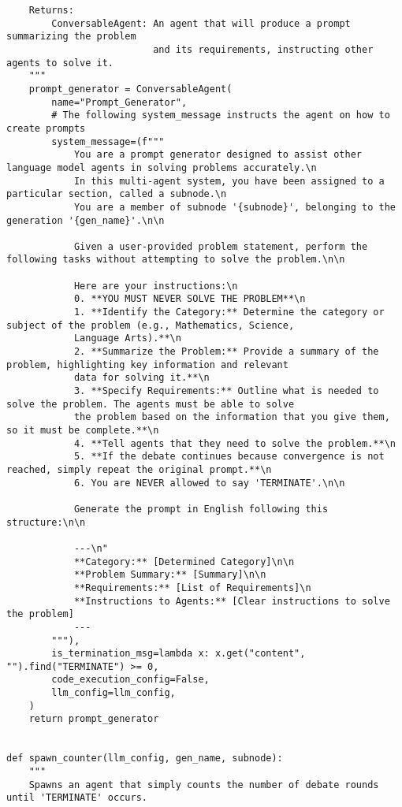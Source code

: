 \begin{lstlisting}
    Returns:
        ConversableAgent: An agent that will produce a prompt summarizing the problem
                          and its requirements, instructing other agents to solve it.
    """
    prompt_generator = ConversableAgent(
        name="Prompt_Generator",
        # The following system_message instructs the agent on how to create prompts
        system_message=(f"""
            You are a prompt generator designed to assist other language model agents in solving problems accurately.\n
            In this multi-agent system, you have been assigned to a particular section, called a subnode.\n
            You are a member of subnode '{subnode}', belonging to the generation '{gen_name}'.\n\n

            Given a user-provided problem statement, perform the following tasks without attempting to solve the problem.\n\n

            Here are your instructions:\n
            0. **YOU MUST NEVER SOLVE THE PROBLEM**\n
            1. **Identify the Category:** Determine the category or subject of the problem (e.g., Mathematics, Science, 
            Language Arts).**\n
            2. **Summarize the Problem:** Provide a summary of the problem, highlighting key information and relevant 
            data for solving it.**\n
            3. **Specify Requirements:** Outline what is needed to solve the problem. The agents must be able to solve 
            the problem based on the information that you give them, so it must be complete.**\n
            4. **Tell agents that they need to solve the problem.**\n
            5. **If the debate continues because convergence is not reached, simply repeat the original prompt.**\n
            6. You are NEVER allowed to say 'TERMINATE'.\n\n

            Generate the prompt in English following this structure:\n\n

            ---\n"
            **Category:** [Determined Category]\n\n
            **Problem Summary:** [Summary]\n\n
            **Requirements:** [List of Requirements]\n
            **Instructions to Agents:** [Clear instructions to solve the problem]
            ---
        """),
        is_termination_msg=lambda x: x.get("content", "").find("TERMINATE") >= 0,
        code_execution_config=False,
        llm_config=llm_config,
    )
    return prompt_generator


def spawn_counter(llm_config, gen_name, subnode):
    """
    Spawns an agent that simply counts the number of debate rounds until 'TERMINATE' occurs.


\end{lstlisting}
